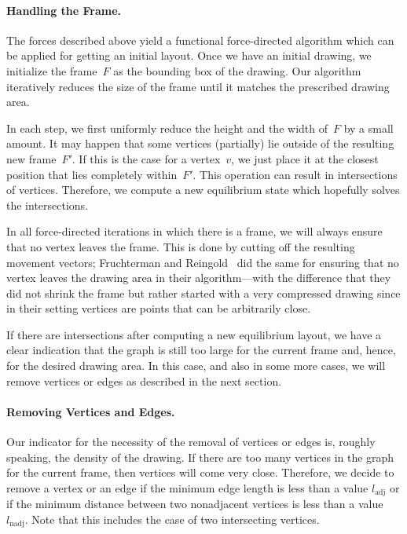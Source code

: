 \documentclass[]{llncs}
\newcommand{\ladj}{\ensuremath{l_\mathrm{adj}}\xspace}
\newcommand{\lnadj}{\ensuremath{l_\mathrm{nadj}}\xspace}
\begin{document}
\paragraph{Handling the Frame.}
\label{sec:gen-frame-handling}
The forces described above yield a functional
force-directed algorithm which can be applied for getting an
initial layout. Once we have an initial drawing, we initialize the
frame~$F$ as the bounding box of the drawing. Our algorithm
iteratively reduces the size of the frame until it matches the
prescribed drawing area.

In each step, we first uniformly reduce the height and the width
of~$F$ by a small amount. It may happen that some vertices (partially)
lie outside of the resulting new frame~$F'$. If this is the case for a
vertex~$v$, we just place it at the closest position that lies
completely within~$F'$. This operation can result in intersections of
vertices. Therefore, we compute a new equilibrium state which
hopefully solves the intersections.

In all force-directed iterations in which there is a frame, we
will always ensure that no vertex leaves the frame. This is done by
cutting off the resulting movement vectors; Fruchterman and
Reingold~\cite{Fruchterman1991} did the same for ensuring that no
vertex leaves the drawing area in their algorithm---with the
difference that they did not shrink the frame but rather started with
a very compressed drawing since in their setting vertices are points
that can be arbitrarily close.

If there are intersections after computing a new equilibrium layout,
we have a clear indication that the graph is still too large for the
current frame and, hence, for the desired drawing area. In this case,
and also in some more cases, we will remove vertices or edges as
described in the next section.


\paragraph{Removing Vertices and Edges.}
\label{sec:gen-remove}
Our indicator for the necessity of the removal of vertices or edges
is, roughly speaking, the density of the drawing. If there are too
many vertices in the graph for the current frame, then vertices will
come very close. Therefore, we decide to remove a vertex or an edge if
the minimum edge length is less than a value \ladj or if the minimum
distance between two nonadjacent vertices is less than a value \lnadj.
Note that this includes the case of two intersecting vertices.
\end{document}
